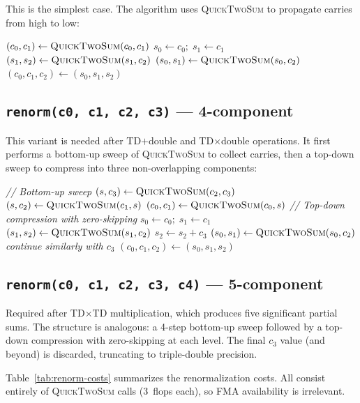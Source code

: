 \documentclass[11pt,a4paper]{article}
\begin{document}
This is the simplest case.  The algorithm uses \textsc{QuickTwoSum}
to propagate carries from high to low:
\begin{algorithmic}[1]
  \Return
\EndIf
\State $(c_0, c_1) \gets \textsc{QuickTwoSum}(c_0, c_1)$
\State $s_0 \gets c_0;\; s_1 \gets c_1$
  \State $(s_1, s_2) \gets \textsc{QuickTwoSum}(s_1, c_2)$
\Else
  \State $(s_0, s_1) \gets \textsc{QuickTwoSum}(s_0, c_2)$
\EndIf
\State $(c_0, c_1, c_2) \gets (s_0, s_1, s_2)$
\end{algorithmic}

\subsection{\texttt{renorm(c0, c1, c2, c3)} --- 4-component}

This variant is needed after TD$+$double and TD$\times$double
operations.  It first performs a bottom-up sweep of
\textsc{QuickTwoSum} to collect carries, then a top-down sweep to
compress into three non-overlapping components:
\begin{algorithmic}[1]
\State \textit{// Bottom-up sweep}
\State $(s, c_3) \gets \textsc{QuickTwoSum}(c_2, c_3)$
\State $(s, c_2) \gets \textsc{QuickTwoSum}(c_1, s)$
\State $(c_0, c_1) \gets \textsc{QuickTwoSum}(c_0, s)$
\State \textit{// Top-down compression with zero-skipping}
\State $s_0 \gets c_0;\; s_1 \gets c_1$
  \State $(s_1, s_2) \gets \textsc{QuickTwoSum}(s_1, c_2)$
  \State $s_2 \gets s_2 + c_3$ 
\Else
  \State $(s_0, s_1) \gets \textsc{QuickTwoSum}(s_0, c_2)$
  \State \textit{continue similarly with $c_3$}
\EndIf
\State $(c_0, c_1, c_2) \gets (s_0, s_1, s_2)$
\end{algorithmic}

\subsection{\texttt{renorm(c0, c1, c2, c3, c4)} --- 5-component}

Required after TD$\times$TD multiplication, which produces five
significant partial sums.  The structure is analogous: a 4-step
bottom-up sweep followed by a top-down compression with
zero-skipping at each level.  The final $c_3$ value (and beyond)
is discarded, truncating to triple-double precision.

Table~\ref{tab:renorm-costs} summarizes the renormalization costs.
All consist entirely of \textsc{QuickTwoSum} calls (3~flops each),
so FMA availability is irrelevant.
\end{document}
